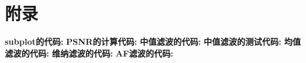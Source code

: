 \documentclass[a4paper,left=2.5cm,right=2.5cm]{article}
\begin{document}
	\section*{附录}
	\begin{appendices}
		\textcolor[rgb]{0.98,0.00,0.00}{\textbf{subplot的代码:}}
		{\consolas}
		\textcolor[rgb]{0.98,0.00,0.00}{\textbf{PSNR的计算代码:}}
		{\consolas}
		\textcolor[rgb]{0.98,0.00,0.00}{\textbf{中值滤波的代码:}}
		{\consolas}
		\textcolor[rgb]{0.98,0.00,0.00}{\textbf{中值滤波的测试代码:}}
		{\consolas}
		\textcolor[rgb]{0.98,0.00,0.00}{\textbf{均值滤波的代码:}}
		{\consolas}
		\textcolor[rgb]{0.98,0.00,0.00}{\textbf{维纳滤波的代码:}}
		{\consolas}
		\textcolor[rgb]{0.98,0.00,0.00}{\textbf{AF滤波的代码:}}\cite{hal}
		{\consolas}
		\par
		
	\end{appendices}
\end{document}

